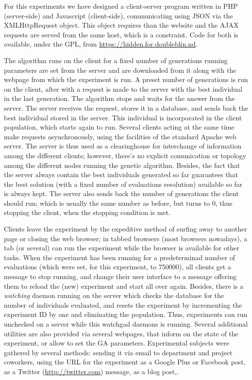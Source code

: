 \documentclass{llncs}
\begin{document}
For this experiments we have designed a client-server program written
in PHP (server-side) and Javascript (client-side), communicating
using JSON via the {\sf XMLHttpRequest} object. This object requires
than the website and the AJAX requests are served from the same host,
which is a constraint. Code for both is available, under the GPL, from
\url{https://hidden.for.doubleblin.nd}.

The algorithm runs on the client for a fixed number of generations
 running parameters are set from the server and are downloaded from
it along with the webpage from which the experiment is run. A preset
number of generations is run on the client, after with a request is
made to the server with the best individual in the last
generation. The algorithm stops and waits for the answer from the
server. The server receives the request, stores it in a database, and
sends back the best individual stored in the server. This individual
is incorporated in the client population, which starts again to run. 
Several clients acting at the same time make requests asynchronously,
using the facilities of the standard Apache web server. The server is
thus used as a clearinghouse for interchange of information among the
different clients; however, there's no explicit comunication or
topology among the different nodes running the genetic
algorithm. Besides, the fact that the server always contain the best
individuals generated so far guarantees that the best solution (with a
fixed number of evaluations resolution) available so far is always
kept. The server also sends back the number of generations the
client should run; which is usually the same number as before, but
turns to 0, thus stopping the client, when the stopping condition is
met. 

Clients leave the experiment by the expeditive method of surfing away
to another page or closing the web browser; in tabbed browsers (most
browsers nowadays), a tab (or several) can run the experiment while
the browser is available for other tasks. When the experiment has been
running for a predeterminad number of evaluations (which were set, for
this experiment, to 750000), all clients get a message to stop
running, and change their user interface to a message offering them to
reload the (new) experiment and start all over again. 
Besides, there is a {\em watching} daemon running on the server which
checks the database for the number of individuals evaluated, and
resets the experiment by incrementing the experiment ID by one and
eliminating the population. Thus, experiments can run unchecked on a
server while this {\sf watchgad} daemons is running. 
Several additional utilities are also provided via several webpages,
that inform on the state of the experiment, or allow to set the GA
parameters. 
Experimental subjects were gathered by several methods: sending it via
email to department and project coworkers, using the URL
for the experiment as a Google Plus or Facebook post, as a Twitter
(\url{http://twitter.com}) message, as a blog post,.
\end{document}
